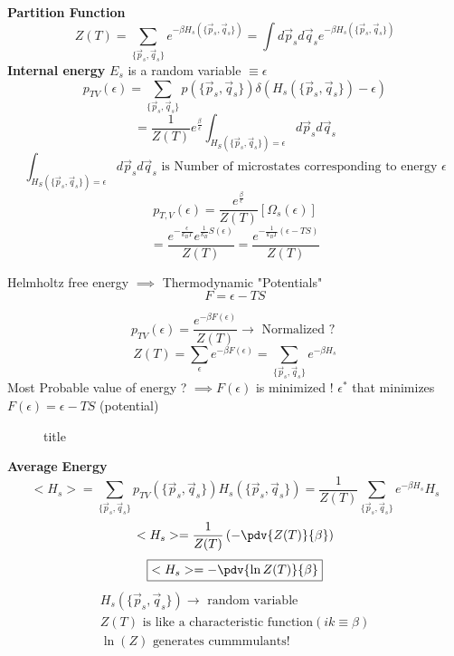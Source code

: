 \textbf{ Partition Function }
\[
    \boxed{Z(T) = \sum\limits_{\{\vec{p}_s,\vec{q}_s\}} e^{-\beta H_s(\{\vec{p}_s,\vec{q}_s\})} = \int d\vec{p}_{s}d\vec{q}_s e^{-\beta H_s(\{\vec{p}_s,\vec{q}_s\})}} 
\]
\textbf{Internal energy} 
\(E_s\) is a random variable \(\equiv \epsilon \)  
\[
    p_{TV}(\epsilon ) = \sum\limits_{\{\vec{p}_s,\vec{q}_s\}}p(\{\vec{p}_s,\vec{q}_s\}) \delta (H_s(\{\vec{p}_s,\vec{q}_s\})-\epsilon )
\]
\[
     = \frac{1}{Z(T)}e^{\frac{\beta}{\epsilon }}\int_{H_S(\{\vec{p}_s,\vec{q}_s\})=\epsilon } d\vec{p}_{s}d\vec{q}_s 
\]
\[
    \int_{H_S(\{\vec{p}_s,\vec{q}_s\})=\epsilon } d\vec{p}_{s}d\vec{q}_s  \text{ is Number of microstates corresponding to energy }\epsilon 
\]
\[
    p_{T,V}(\epsilon ) = \frac{e^{\frac{\beta}{\epsilon }}}{Z(T)}[\Omega_s(\epsilon )]
\]
\[
    = \frac{e^{-\frac{\epsilon}{k_B T}}e^{\frac{1}{k_B}S(\epsilon )}}{Z(T)} = \frac{e^{-\frac{1}{k_B T}(\epsilon - TS)}}{Z(T)}
\]
\begin{definition}
    Helmholtz free energy \(\implies \) Thermodynamic "Potentials"
    \[
        F = \epsilon - TS
    \]
\end{definition}
\[
    p_{TV}(\epsilon ) = \frac{e^{-\beta F(\epsilon )}}{Z(T)}  \to \text{ Normalized ? }
\]
\[
    Z(T) = \sum\limits_{\epsilon }e^{-\beta F(\epsilon )} = \sum\limits_{\{\vec{p}_s,\vec{q}_s\}}e^{-\beta H_s}
\]
Most Probable value of energy ? \(\implies F(\epsilon )\) is minimized ! \(\epsilon^* \) that minimizes \(F(\epsilon ) = \epsilon - TS\) (potential)
\begin{figure}[H]
    \centering
    \caption{title}
    \label{fig:distenergy}
\end{figure}
\textbf{Average}  \textbf{Energy} 
\[
    <H_{s} > = \sum\limits_{\{\vec{p}_s,\vec{q}_s\}} p_{TV}(\{\vec{p}_s,\vec{q}_s\}) H_s(\{\vec{p}_s,\vec{q}_s\}) = \frac{1}{Z(T)}\sum\limits_{\{\vec{p}_s,\vec{q}_s\}} e^{- \beta H_s}H_s
\]
\[
    <H_s> = \frac{1}{Z(T)}\left(-\pdv{Z(T)}{\beta}\right)
\]
\[
    \boxed{<H_s> = -\pdv{\ln Z(T)}{\beta}} 
\]
\begin{gather}
    H_s(\{\vec{p}_s,\vec{q}_s\})\to  \text{ random variable}\\
    Z(T) \text{ is like a characteristic function} (ik \equiv \beta)\\
    \ln (Z) \text{ generates cummmulants!}
\end{gather}